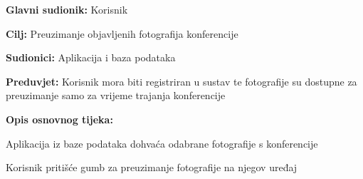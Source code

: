 				
				\noindent {}
				\begin{packed_item}
					
					\item \textbf{Glavni sudionik: }Korisnik
					\item  \textbf{Cilj:} Preuzimanje objavljenih fotografija konferencije
					\item  \textbf{Sudionici:} Aplikacija i baza podataka
					\item  \textbf{Preduvjet:} Korisnik mora biti registriran u sustav te fotografije su dostupne za preuzimanje samo za vrijeme trajanja konferencije
					\item  \textbf{Opis osnovnog tijeka:}
					
					\item[] \begin{packed_enum}
						
						\item Aplikacija iz baze podataka dohvaća odabrane fotografije s konferencije
						\item Korisnik pritišće gumb za preuzimanje fotografije na njegov uređaj
						
					\end{packed_enum}
					
				\end{packed_item}
				
